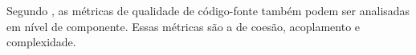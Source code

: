 Segundo , as métricas de qualidade de código-fonte também podem ser analisadas em nível de componente. Essas métricas são a de coesão, acoplamento e complexidade.






